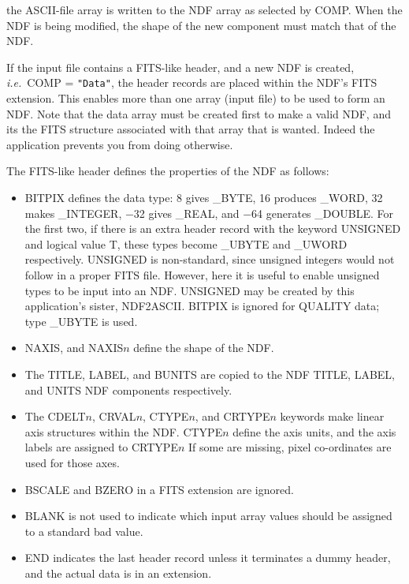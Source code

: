 {{{         \sstitem
            the ASCII-file array is written to the NDF array as
            selected by COMP.  When the NDF is being modified, the shape
            of the new component must match that of the NDF.

         \sstitem
            If the input file contains a FITS-like header, and a new
            NDF is created, {\it i.e.}\ COMP = {\tt "Data"}, the header records are
            placed within the NDF's FITS extension.  This enables more
            than one array (input file) to be used to form an NDF.  Note
            that the data array must be created first to make a valid NDF,
            and its the FITS structure associated with that array that is
            wanted.  Indeed the application prevents you from doing
            otherwise.

         \sstitem
            The FITS-like header defines the properties of the NDF as
            follows:
            \begin{itemize}
            \item BITPIX defines the data type: 8 gives \_BYTE, 16 produces
            \_WORD, 32 makes \_INTEGER, $-$32 gives \_REAL, and $-$64 generates
            \_DOUBLE.  For the first two, if there is an extra header
            record with the keyword UNSIGNED and logical value T, these
            types become \_UBYTE and \_UWORD respectively.  UNSIGNED is
            non-standard, since unsigned integers would not follow in a
            proper FITS file.  However, here it is useful to enable
            unsigned types to be input into an NDF.  UNSIGNED may be
            created by this application's sister, NDF2ASCII.  BITPIX is
            ignored for QUALITY data; type \_UBYTE is used.
            \item NAXIS, and NAXIS$n$ define the shape of the NDF.
            \item The TITLE, LABEL, and BUNITS are copied to the NDF
            TITLE, LABEL, and UNITS NDF components respectively.
            \item The CDELT$n$, CRVAL$n$, CTYPE$n$, and CRTYPE$n$ keywords make
            linear axis structures within the NDF.  CTYPE$n$ define the
            axis units, and the axis labels are assigned to CRTYPE$n$ If
            some are missing, pixel co-ordinates are used for those
            axes.
            \item BSCALE and BZERO in a FITS extension are ignored.
            \item BLANK is not used to indicate which input array values
            should be assigned to a standard bad value.
            \item END indicates the last header record unless it
            terminates a dummy header, and the actual data is in an
            extension.
            \end{itemize}

}}}
